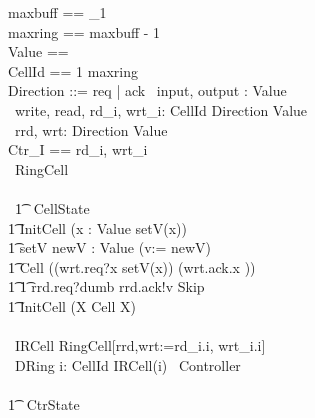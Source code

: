 \documentclass[10pt]{article}
\begin{document}
\begin{circus}
maxbuff == \nat_1 \\
maxring == maxbuff - 1 \\
Value == \nat \\
CellId == 1 \upto maxring \\
Direction ::=  req | ack
\also
\circchannel\ input, output : Value \\
\circchannel\ write, read, rd\_i, wrt\_i: CellId \cross Direction \cross Value \\
\circchannel\ rrd, wrt: Direction \cross Value \\
\circchannelset Ctr\_I == \lchanset rd\_i, wrt\_i \rchanset \\

\circprocess\ RingCell \circdef\\
\circbegin\\\
\t1 \circstate\ CellState  \\
\t1 InitCell \circdef (\Intchoice x : Value \circspot setV(x)) \\
\t1 setV \circdef \circval newV : Value \circspot (v:= newV) \\
\t1 Cell \circdef ((wrt.req?x \then setV(x)) \circseq (wrt.ack.x \then \Skip))  \\
\t1 \t1         \extchoice rrd.req?dumb \then rrd.ack!v \then Skip \\
\t1 \circspot InitCell \circseq (\circmu X \circspot Cell \circseq X)
\\
\circend
\\
\circprocess\ IRCell \circdef RingCell[rrd,wrt:=rd\_i.i, wrt\_i.i]
\\
\circprocess\ DRing \circdef \Interleave i: CellId \circspot IRCell(i)
\also
\circprocess\ Controller \circdef \\
\circbegin\\
\t1 \circstate\ CtrState  \\


\end{circus}
\end{document}
